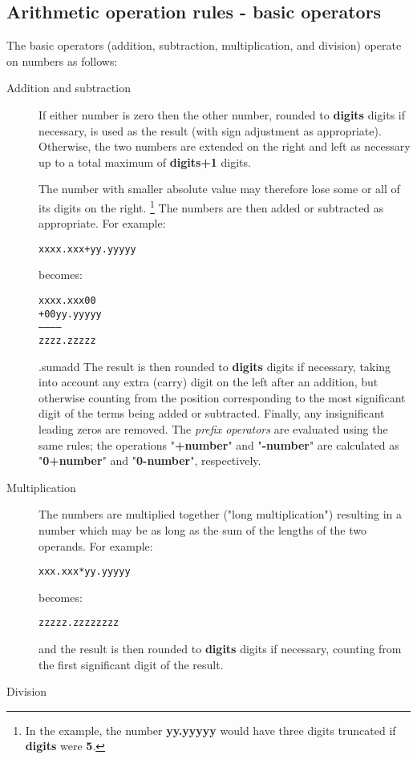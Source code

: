 \subsection{Arithmetic operation rules - basic operators}\label{}
 The basic operators (addition, subtraction, multiplication, and
division) operate on numbers as follows:
\begin{description}
\item[Addition and subtraction]

If either number is zero then the other number, rounded
to \textbf{digits} digits if necessary, is used as the result (with
sign adjustment as appropriate).
Otherwise, the two numbers are extended on the right and left as
necessary up to a total maximum of \textbf{digits+1} digits.
 
The number with smaller absolute value may therefore lose some or
all of its digits on the right.
\footnote{
In the example, the number \textbf{yy.yyyyy} would have three digits
truncated if \textbf{digits} were \textbf{5}.
}
The numbers are then added or subtracted as appropriate.  For example:
\begin{alltt}
xxxx.xxx + yy.yyyyy
\end{alltt}
becomes:
\begin{alltt}
  xxxx.xxx00
+ 00yy.yyyyy
------------
  zzzz.zzzzz
\end{alltt}
.sumadd
The result is then rounded to \textbf{digits} digits if necessary,
taking into account any extra (carry) digit on the left after an
addition, but otherwise counting from the position corresponding to the
most significant digit of the terms being added or subtracted.
Finally, any insignificant leading zeros are removed.
 The \emph{prefix operators} are evaluated using the same rules;
the operations "\textbf{+number}" and "\textbf{-number}"
are calculated as "\textbf{0+number}" and
"\textbf{0-number}", respectively.
\item[Multiplication]

The numbers are multiplied together ("long multiplication")
resulting in a number which may be as long as the sum of the lengths of
the two operands.  For example:
\begin{alltt}
xxx.xxx * yy.yyyyy
\end{alltt}
becomes:
\begin{alltt}
zzzzz.zzzzzzzz
\end{alltt}
and the result is then rounded to \textbf{digits} digits if
necessary, counting from the first significant digit of the result.
\item[Division]


\end{description}
